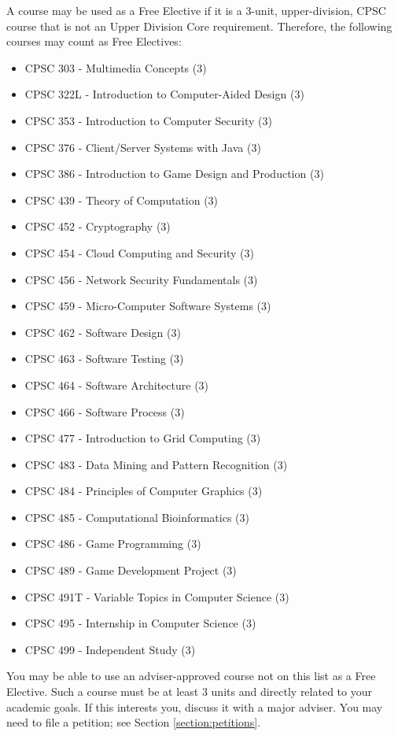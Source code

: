 \documentclass{book}
\begin{document}
A course may be used as a Free Elective if it is a 3-unit, upper-division, CPSC course that is not an Upper Division Core requirement. Therefore, the following courses may count as Free Electives:
\begin{itemize}
\item CPSC 303 - Multimedia Concepts (3)
\item CPSC 322L - Introduction to Computer-Aided Design (3)
\item CPSC 353 - Introduction to Computer Security (3)
\item CPSC 376 - Client/Server Systems with Java (3)
\item CPSC 386 - Introduction to Game Design and Production (3)
\item CPSC 439 - Theory of Computation (3)
\item CPSC 452 - Cryptography (3)
\item CPSC 454 - Cloud Computing and Security (3)
\item CPSC 456 - Network Security Fundamentals (3)
\item CPSC 459 - Micro-Computer Software Systems (3)
\item CPSC 462 - Software Design (3)
\item CPSC 463 - Software Testing (3)
\item CPSC 464 - Software Architecture (3)
\item CPSC 466 - Software Process (3)
\item CPSC 477 - Introduction to Grid Computing (3)
\item CPSC 483 - Data Mining and Pattern Recognition (3)
\item CPSC 484 - Principles of Computer Graphics (3)
\item CPSC 485 - Computational Bioinformatics (3)
\item CPSC 486 - Game Programming (3)
\item CPSC 489 - Game Development Project (3)
\item CPSC 491T - Variable Topics in Computer Science (3)
\item CPSC 495 - Internship in Computer Science (3)
\item CPSC 499 - Independent Study (3)
\end{itemize}

You may be able to use an adviser-approved course not on this list as a Free Elective. Such a course must be at least 3 units and directly related to your academic goals. If this interests you, discuss it with a major adviser. You may need to file a petition; see Section \ref{section:petitions}.
\end{document}
